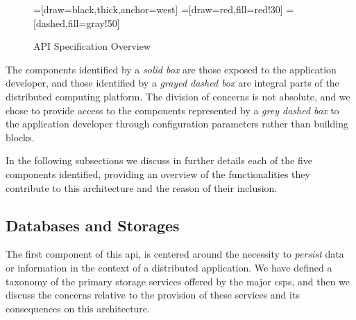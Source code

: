 \documentclass[12pt, titlepage]{uo_temp}
\begin{document}
     \begin{center}
     \begin{figure}[h]
       =[draw=black,thick,anchor=west]
       =[draw=red,fill=red!30]
       =[dashed,fill=gray!50]
     \caption{API Specification Overview}
     \label{api_spec_overview}
     \end{figure}
     \end{center}

     The components identified by a \emph{solid box} are those exposed to the application
     developer, and those identified by a \emph{grayed dashed box} are integral parts of
     the distributed computing platform. The division of concerns is not absolute, and we
     chose to provide access to the components represented by a \emph{grey dashed box} to
     the application developer through configuration parameters rather than building
     blocks.

     In the following subsections we discuss in further details each of the five
     components identified, providing an overview of the functionalities they contribute
     to this architecture and the reason of their inclusion.

     \subsection{Databases and Storages}
     The first component of this \gls{api}, is centered around the necessity to
     \emph{persist} data or information in the context of a distributed application. We
     have defined a taxonomy of the primary storage services offered by the major
     \gls{csp}s, and then we discuss the concerns relative to the provision of these
     services and its consequences on this architecture.
\end{document}
